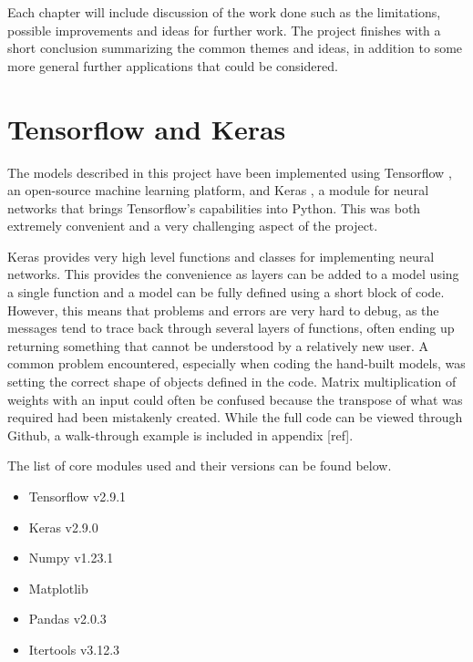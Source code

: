 \documentclass{somasmsc}
\begin{document}
Each chapter will include discussion of the work done such as the limitations, possible improvements and ideas for further work. The project finishes with a short conclusion summarizing the common themes and ideas, in addition to some more general further applications that could be considered.

\section{Tensorflow and Keras}

The models described in this project have been implemented using Tensorflow \citep{tensorflow2015-whitepaper}, an open-source machine learning platform, and Keras \citep{chollet2015keras}, a module for neural networks that brings Tensorflow's capabilities into Python. This was both extremely convenient and a very challenging aspect of the project.

Keras provides very high level functions and classes for implementing neural networks. This provides the convenience as layers can be added to a model using a single function and a model can be fully defined using a short block of code. However, this means that problems and errors are very hard to debug, as the messages tend to trace back through several layers of functions, often ending up returning something that cannot be understood by a relatively new user. A common problem encountered, especially when coding the hand-built models, was setting the correct shape of objects defined in the code. Matrix multiplication of weights with an input could often be confused because the transpose of what was required had been mistakenly created. While the full code can be viewed through Github, a walk-through example is included in appendix [ref].

The list of core modules used and their versions can be found below.

\begin{itemize}
    \item Tensorflow v2.9.1 \citep{tensorflow2015-whitepaper}
    \item Keras v2.9.0 \citep{chollet2015keras}
    \item Numpy v1.23.1 \citep{harris2020array}
    \item Matplotlib \citep{Hunter:2007}
    \item Pandas v2.0.3 \citep{mckinney-proc-scipy-2010}
    \item Itertools v3.12.3 \citep{van1995python}
\end{itemize}
\end{document}

